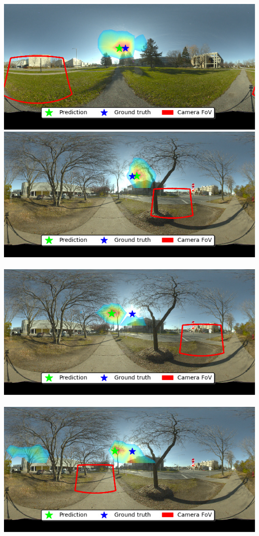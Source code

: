 \begin{minipage}{\linewidth}
\begin{multicols}{4}
\includegraphics[width=\mywidth]{AG8A2833_Panorama_hdr-corrected_004.jpg}\\
\includegraphics[width=\mywidth]{AG8A2875_Panorama_hdr-corrected_002.jpg}\\
\vspace{\panoheight}\\
\includegraphics[width=\mywidth]{AG8A2875_Panorama_hdr-corrected_008.jpg}\\
\vspace{\panoheight}\\
\includegraphics[width=\mywidth]{AG8A2875_Panorama_hdr-corrected_007.jpg}\\

\end{multicols}
\end{minipage}
